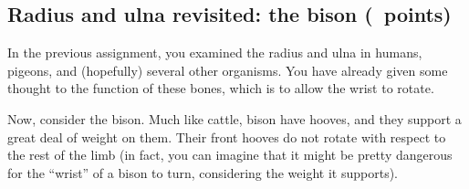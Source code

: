 \documentclass[12pt, addpoints, hidelinks]{exam}
\begin{document}
\subsection*{Radius and ulna revisited: the bison (\numpoints\ points)}

In the previous assignment, you examined the radius and ulna in
humans, pigeons, and (hopefully) several other organisms. You have
already given some thought to the function of these bones,
which is to allow the wrist to rotate.

Now, consider the bison. Much like cattle, bison have hooves, and they
support a great deal of weight on them. Their front hooves do not rotate
with respect to the rest of the limb (in fact, you can imagine that it
might be pretty dangerous for the ``wrist'' of a bison to turn,
considering the weight it supports).
\end{document}
